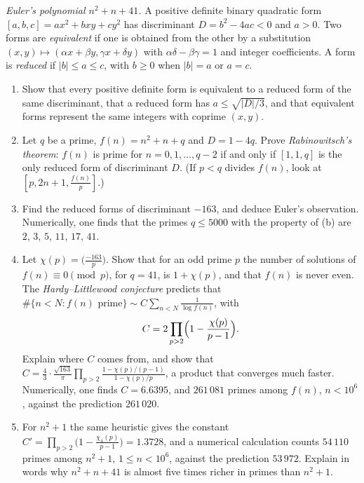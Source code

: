 \begin{exercise}[Journey]\label{pb:euler41}
\emph{Euler's polynomial $n^2+n+41$.} A positive definite binary quadratic form $[a,b,c]=ax^2+bxy+cy^2$ has discriminant $D=b^2-4ac<0$ and $a>0$. Two forms are
\emph{equivalent} if one is obtained from the other by a substitution $(x,y)\mapsto(\alpha x+\beta y,\gamma x+\delta y)$ with $\alpha\delta-\beta\gamma=1$ and integer
coefficients. A form is \emph{reduced} if $|b|\le a\le c$, with $b\ge0$ when $|b|=a$ or $a=c$.
\begin{enumerate}[label=(\alph*)]
\item Show that every positive definite form is equivalent to a reduced form of the same discriminant, that a reduced form has $a\le\sqrt{|D|/3}$, and that equivalent
forms represent the same integers with coprime $(x,y)$.
\item Let $q$ be a prime, $f(n)=n^2+n+q$ and $D=1-4q$. Prove \emph{Rabinowitsch's theorem}: $f(n)$ is prime for $n=0,1,\dots,q-2$ if and only if $[1,1,q]$ is the only
reduced form of discriminant $D$. (If $p<q$ divides $f(n)$, look at $[p,2n+1,\frac{f(n)}p]$.)
\item Find the reduced forms of discriminant $-163$, and deduce Euler's observation. Numerically, one finds that the primes $q\le5000$ with the property of (b) are $2$, $3$,
$5$, $11$, $17$, $41$.
\item Let $\chi(p)=\bigl(\frac{-163}p\bigr)$. Show that for an odd prime $p$ the number of solutions of $f(n)\equiv0\pmod p$, for $q=41$, is $1+\chi(p)$, and that $f(n)$ is
never even. The \emph{Hardy--Littlewood conjecture} predicts that $\#\{n<N:f(n)\text{ prime}\}\sim C\sum_{n<N}\frac1{\log f(n)}$, with
\[
C=2\prod_{p>2}\Bigl(1-\frac{\chi(p)}{p-1}\Bigr).
\]
Explain where $C$ comes from, and show that $C=\frac43\cdot\frac{\sqrt{163}}\pi\prod_{p>2}\frac{1-\chi(p)/(p-1)}{1-\chi(p)/p}$, a product that converges much faster.
Numerically, one finds $C=6.6395$, and $261\,081$ primes among $f(n)$, $n<10^6$, against the prediction $261\,020$.
\item For $n^2+1$ the same heuristic gives the constant $C'=\prod_{p>2}\bigl(1-\frac{\chi_4(p)}{p-1}\bigr)=1.3728$, and a numerical calculation counts $54\,110$ primes among
$n^2+1$, $1\le n<10^6$, against the prediction $53\,972$. Explain in words why $n^2+n+41$ is almost five times richer in primes than $n^2+1$.
\end{enumerate}
\end{exercise}

